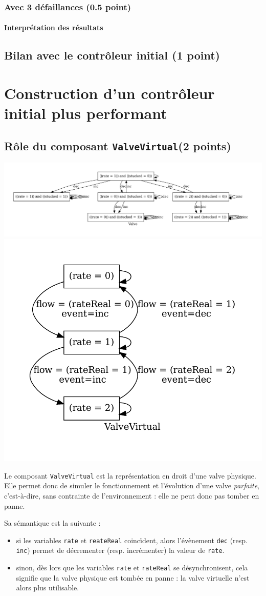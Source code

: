 \documentclass[a4paper]{book}
\begin{document}
\subsubsection{Avec 3 défaillances (0.5 point)}

\paragraph{Interprétation des résultats}

\subsection{Bilan avec le contrôleur initial (1 point)}

\section{Construction d'un contrôleur initial plus performant}
\subsection{Rôle du composant {\tt ValveVirtual}(2 points)}
\includegraphics[height=.2\textheight,width=.5\textwidth]{Graphs/Valve-modes.pdf}
\includegraphics[height=.2\textheight,width=.5\textwidth]{Graphs/ValveVirtual-modes.pdf}

Le composant \texttt{ValveVirtual} est la représentation en droit d'une valve
physique. Elle permet donc de simuler le fonctionnement et l'évolution d'une
valve \textit{parfaite}, c'est-à-dire, sans contrainte de l'environnement :
elle ne peut donc pas tomber en panne.

Sa sémantique est la suivante :
\begin{itemize}
  \item si les variables \texttt{rate} et \texttt{reateReal} coincïdent, alors l'évènement \texttt{dec} (resp. \texttt{inc})
    permet de décrementer (resp. incrémenter) la valeur de \texttt{rate}.
  \item sinon, dès lors que les variables \texttt{rate} et \texttt{rateReal} se
    désynchronisent, cela signifie que la valve physique est tombée en panne : la valve virtuelle
    n'est alors plus utilisable.
\end{itemize}
\end{document}
